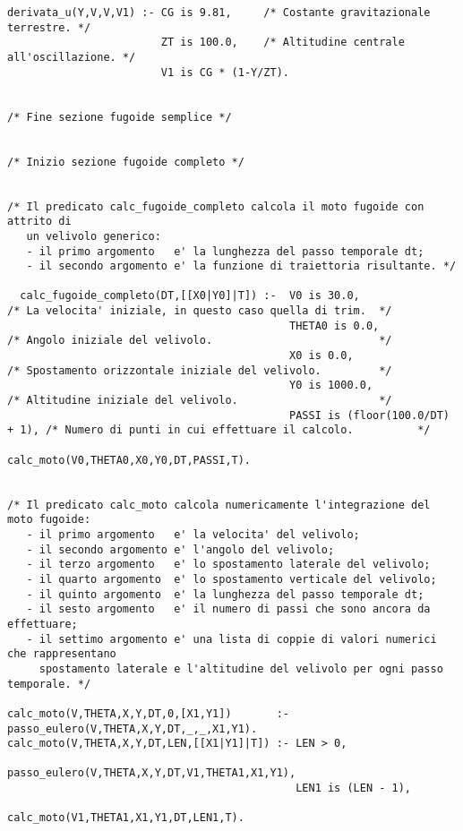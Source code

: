 \begin{verbatim}
derivata_u(Y,V,V,V1) :- CG is 9.81,     /* Costante gravitazionale terrestre. */
                        ZT is 100.0,    /* Altitudine centrale all'oscillazione. */
                        V1 is CG * (1-Y/ZT).


/* Fine sezione fugoide semplice */


/* Inizio sezione fugoide completo */


/* Il predicato calc_fugoide_completo calcola il moto fugoide con attrito di 
   un velivolo generico:
   - il primo argomento   e' la lunghezza del passo temporale dt;
   - il secondo argomento e' la funzione di traiettoria risultante. */

  calc_fugoide_completo(DT,[[X0|Y0]|T]) :-  V0 is 30.0,                     /* La velocita' iniziale, in questo caso quella di trim.  */
                                            THETA0 is 0.0,                  /* Angolo iniziale del velivolo.                          */
                                            X0 is 0.0,                      /* Spostamento orizzontale iniziale del velivolo.         */
                                            Y0 is 1000.0,                   /* Altitudine iniziale del velivolo.                      */
                                            PASSI is (floor(100.0/DT) + 1), /* Numero di punti in cui effettuare il calcolo.          */
                                            calc_moto(V0,THETA0,X0,Y0,DT,PASSI,T).


/* Il predicato calc_moto calcola numericamente l'integrazione del moto fugoide:
   - il primo argomento   e' la velocita' del velivolo; 
   - il secondo argomento e' l'angolo del velivolo;
   - il terzo argomento   e' lo spostamento laterale del velivolo;
   - il quarto argomento  e' lo spostamento verticale del velivolo;
   - il quinto argomento  e' la lunghezza del passo temporale dt;
   - il sesto argomento   e' il numero di passi che sono ancora da effettuare;
   - il settimo argomento e' una lista di coppie di valori numerici che rappresentano 
     spostamento laterale e l'altitudine del velivolo per ogni passo temporale. */

calc_moto(V,THETA,X,Y,DT,0,[X1,Y1])       :- passo_eulero(V,THETA,X,Y,DT,_,_,X1,Y1).
calc_moto(V,THETA,X,Y,DT,LEN,[[X1|Y1]|T]) :- LEN > 0,
                                             passo_eulero(V,THETA,X,Y,DT,V1,THETA1,X1,Y1),
                                             LEN1 is (LEN - 1),
                                             calc_moto(V1,THETA1,X1,Y1,DT,LEN1,T).



\end{verbatim}
